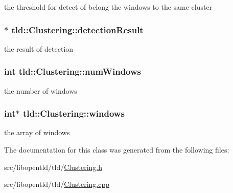 the threshold for detect of belong the windows to the same cluster 

\hypertarget{classtld_1_1Clustering_abfc41de1f95b5c019676aa5f42d9e960}{
\subsubsection[{detection\-Result}]{$\ast$ tld\-::\-Clustering\-::detection\-Result}}\label{classtld_1_1Clustering_abfc41de1f95b5c019676aa5f42d9e960}


the result of detection 

\hypertarget{classtld_1_1Clustering_a25b3b82795ea06758b6a321f856f004b}{
\subsubsection[{num\-Windows}]{\setlength{\rightskip}{0pt plus 5cm}int tld\-::\-Clustering\-::num\-Windows}}\label{classtld_1_1Clustering_a25b3b82795ea06758b6a321f856f004b}


the number of windows 

\hypertarget{classtld_1_1Clustering_acd1251895c2999f2041b50142cf81dda}{
\subsubsection[{windows}]{\setlength{\rightskip}{0pt plus 5cm}int$\ast$ tld\-::\-Clustering\-::windows}}\label{classtld_1_1Clustering_acd1251895c2999f2041b50142cf81dda}


the array of windows 



The documentation for this class was generated from the following files\-:\begin{DoxyCompactItemize}
\item 
src/libopentld/tld/\hyperlink{Clustering_8h}{Clustering.\-h}\item 
src/libopentld/tld/\hyperlink{Clustering_8cpp}{Clustering.\-cpp}\end{DoxyCompactItemize}
